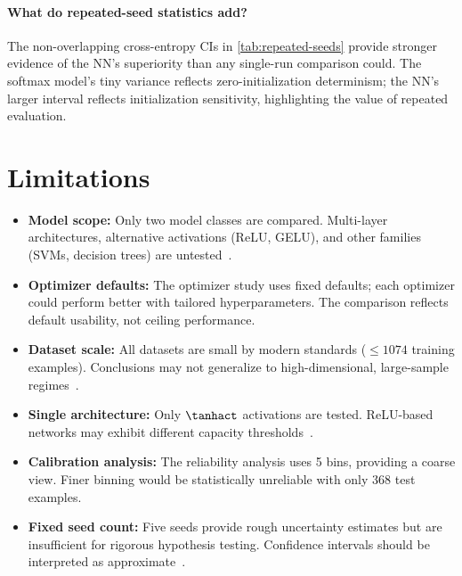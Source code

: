 \documentclass[sigconf,screen,nonacm]{acmart}
\begin{document}
\paragraph{What do repeated-seed statistics add?}
The non-overlapping cross-entropy CIs in \cref{tab:repeated-seeds} provide stronger evidence of the NN's superiority than any single-run comparison could. The softmax model's tiny variance reflects zero-initialization determinism; the NN's larger interval reflects initialization sensitivity, highlighting the value of repeated evaluation.

\section{Limitations}

\begin{itemize}[leftmargin=*]
    \item \textbf{Model scope:} Only two model classes are compared. Multi-layer architectures, alternative activations (ReLU, GELU), and other families (SVMs, decision trees) are untested~\cite{goodfellow2016deep}.
    \item \textbf{Optimizer defaults:} The optimizer study uses fixed defaults; each optimizer could perform better with tailored hyperparameters. The comparison reflects default usability, not ceiling performance.
    \item \textbf{Dataset scale:} All datasets are small by modern standards ($\leq 1074$ training examples). Conclusions may not generalize to high-dimensional, large-sample regimes~\cite{murphy2022pml}.
    \item \textbf{Single architecture:} Only $\tanhact$ activations are tested. ReLU-based networks may exhibit different capacity thresholds~\cite{cs231n_nn1}.
    \item \textbf{Calibration analysis:} The reliability analysis uses 5 bins, providing a coarse view. Finer binning would be statistically unreliable with only 368 test examples.
    \item \textbf{Fixed seed count:} Five seeds provide rough uncertainty estimates but are insufficient for rigorous hypothesis testing. Confidence intervals should be interpreted as approximate~\cite{murphy2022pml}.
\end{itemize}

\end{document}
